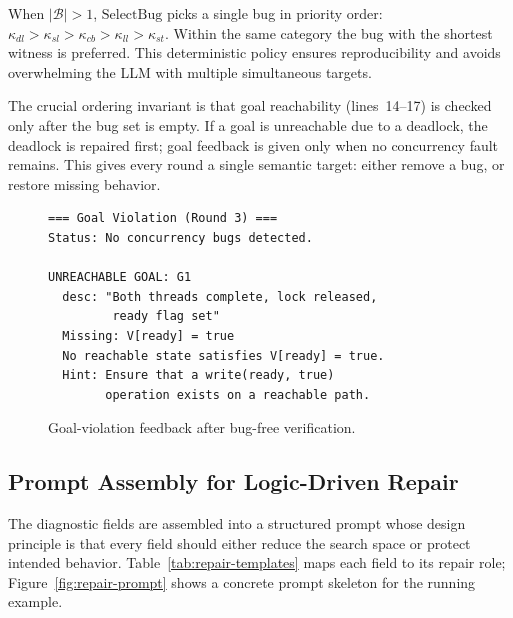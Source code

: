\documentclass[sigconf]{acmart}
\begin{document}
When $|\mathcal{B}|>1$, $\text{SelectBug}$ picks a single bug in priority order: $\kappa_{dl}>\kappa_{sl}>\kappa_{cb}>\kappa_{ll}>\kappa_{st}$. Within the same category the bug with the shortest witness is preferred. This deterministic policy ensures reproducibility and avoids overwhelming the LLM with multiple simultaneous targets.

The crucial ordering invariant is that goal reachability (lines~14--17) is checked only after the bug set is empty.
If a goal is unreachable due to a deadlock, the deadlock is repaired first; goal feedback is given only when no concurrency
fault remains. This gives every round a single semantic target: either remove a bug, or restore missing behavior.

\begin{figure}[t]
\begin{lstlisting}[basicstyle=\small\ttfamily,frame=single]
=== Goal Violation (Round 3) ===
Status: No concurrency bugs detected.

UNREACHABLE GOAL: G1
  desc: "Both threads complete, lock released,
         ready flag set"
  Missing: V[ready] = true
  No reachable state satisfies V[ready] = true.
  Hint: Ensure that a write(ready, true)
        operation exists on a reachable path.
\end{lstlisting}
\caption{Goal-violation feedback after bug-free verification.}
\label{fig:goal-violation}
\end{figure}

\subsection{Prompt Assembly for Logic-Driven Repair}
\label{subsec:repair-templates}

The diagnostic fields are assembled into a structured prompt whose design principle is that every field should either reduce
the search space or protect intended behavior. Table~\ref{tab:repair-templates} maps each field to its repair role; Figure~\ref{fig:repair-prompt} shows a concrete prompt skeleton for the running example. 
\end{document}
